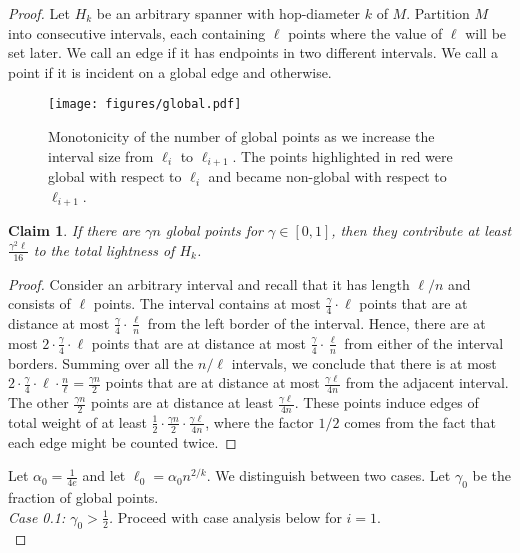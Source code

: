 \documentclass[11pt,english]{article}
\renewcommand{\emph}[1]{{\color{MyGreen}{\em #1}}}
\newtheorem{claim}[theorem]{Claim}
\begin{document}
\begin{proof}
Let $H_k$ be an arbitrary spanner with hop-diameter $k$ of $M$. 
Partition $M$ into consecutive intervals, each containing $\ell$ points where the value of $\ell$ will be set later. We call an edge \emph{global} if it has endpoints in two different intervals. We call a point \emph{global} if it is incident on a global edge and \emph{non-global} otherwise. 
\begin{figure}
\centering
    \texttt{[image: figures/global.pdf]}
    \caption{Monotonicity of the number of global points as we increase the interval size from $\ell_i$ to $\ell_{i+1}$. The points highlighted in red were global with respect to $\ell_i$ and became non-global with respect to $\ell_{i+1}$.}
    \label{fig:global}
\end{figure}
\begin{claim}\label{st:global}
If there are $\gamma n$ global points for $\gamma \in [0,1]$, then they contribute at least $\frac{\gamma^2\ell }{16}$ to the total lightness of $H_k$.
\end{claim}
\begin{proof}
Consider an arbitrary interval and recall that it has length $\ell/n$ and consists of $\ell$ points. The interval contains at most $ \frac{\gamma}{4}\cdot \ell$ points that are at distance at most $\frac{\gamma}{4} \cdot \frac{\ell}{n}$ from the left border of the interval. Hence, there are at most $ 2\cdot\frac{\gamma}{4}\cdot \ell$ points that are at distance at most $\frac{\gamma}{4} \cdot \frac{\ell}{n}$ from either of the interval borders. Summing over all the $n/\ell$ intervals, we conclude that there is at most $2\cdot\frac{\gamma}{4}\cdot \ell \cdot \frac{n}{\ell} = \frac{\gamma n}{2}$ points that are at distance at most $\frac{\gamma \ell}{4n}$ from the adjacent interval. The other $\frac{\gamma n}{2}$ points are at distance at least $\frac{\gamma \ell}{4n}$. These points induce edges of total weight of at least $\frac{1}{2}\cdot\frac{\gamma n}{2}\cdot\frac{\gamma \ell}{4n}$, where the factor $1/2$ comes from the fact that each edge might be counted twice.
\end{proof}
Let $\alpha_0 = \frac{1}{4e}$ and let $\ell_0 = \alpha_0n^{2/k}$. We distinguish between two cases. Let $\gamma_0$ be the fraction of global points.\\


\noindent\textit{Case 0.1: $\gamma_0 > \frac{1}{2}$.} Proceed with case analysis below for $i=1$.\\


\end{proof}
\end{document}
